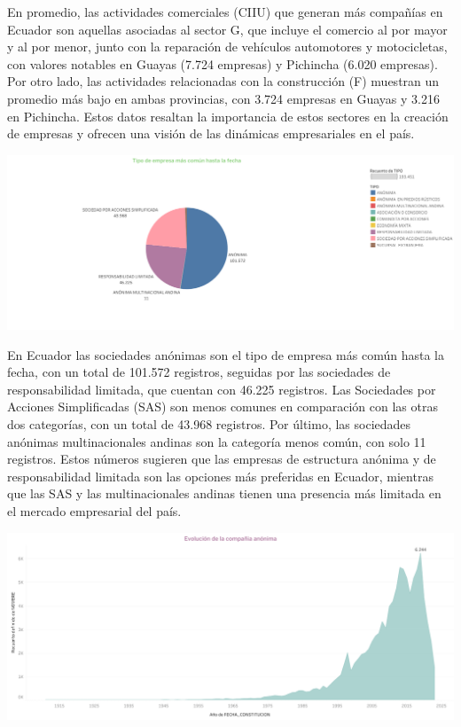\documentclass[
]{article}
\begin{document}
En promedio, las actividades comerciales (CIIU) que generan más
compañías en Ecuador son aquellas asociadas al sector G, que incluye el
comercio al por mayor y al por menor, junto con la reparación de
vehículos automotores y motocicletas, con valores notables en Guayas
(7.724 empresas) y Pichincha (6.020 empresas). Por otro lado, las
actividades relacionadas con la construcción (F) muestran un promedio
más bajo en ambas provincias, con 3.724 empresas en Guayas y 3.216 en
Pichincha. Estos datos resaltan la importancia de estos sectores en la
creación de empresas y ofrecen una visión de las dinámicas empresariales
en el país.

\includegraphics{imagenes/Hoja 8.png}

En Ecuador las sociedades anónimas son el tipo de empresa más común
hasta la fecha, con un total de 101.572 registros, seguidas por las
sociedades de responsabilidad limitada, que cuentan con 46.225
registros. Las Sociedades por Acciones Simplificadas (SAS) son menos
comunes en comparación con las otras dos categorías, con un total de
43.968 registros. Por último, las sociedades anónimas multinacionales
andinas son la categoría menos común, con solo 11 registros. Estos
números sugieren que las empresas de estructura anónima y de
responsabilidad limitada son las opciones más preferidas en Ecuador,
mientras que las SAS y las multinacionales andinas tienen una presencia
más limitada en el mercado empresarial del país.

\includegraphics{imagenes/Hoja 9.png}
\end{document}
